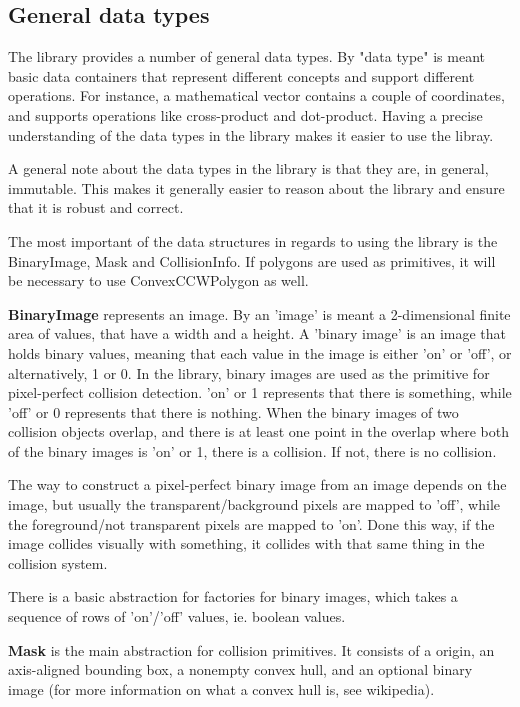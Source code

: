 
\subsection{General data types}

The library provides a number of general data types.
By "data type" is meant basic data containers that
represent different concepts and support different
operations. For instance, a mathematical vector contains a couple
of coordinates, and supports operations like cross-product
and dot-product. Having a precise understanding of the data types
in the library makes it easier to use the libray.

A general note about the data types in the library is that they
are, in general, immutable. This makes it generally easier
to reason about the library and ensure that it is robust
and correct.

The most important of the data structures in regards to using
the library is the BinaryImage, Mask and CollisionInfo.
If polygons are used as primitives, it will be necessary to use
ConvexCCWPolygon as well.

\textbf{BinaryImage} represents an image. By an 'image' is meant
a 2-dimensional finite area of values, that have a width and a height.
A 'binary image' is an image that holds binary values, meaning that
each value in the image is either 'on' or 'off', or alternatively,
1 or 0. In the library, binary images are used as the primitive for
pixel-perfect collision detection. 'on' or 1 represents that there
is something, while 'off' or 0 represents that there is nothing.
When the binary images of two collision objects overlap,
and there is at least one point in the overlap where both of the
binary images is 'on' or 1, there is a collision. If not, there
is no collision.

The way to construct a pixel-perfect binary image from an image
depends on the image, but usually the transparent/background pixels
are mapped to 'off', while the foreground/not transparent pixels are mapped
to 'on'. Done this way, if the image collides visually with something,
it collides with that same thing in the collision system.

There is a basic abstraction for factories for binary images,
which takes a sequence of rows of 'on'/'off' values, ie. boolean values.

\textbf{Mask} is the main abstraction for collision primitives.
It consists of a origin, an axis-aligned bounding box,
a nonempty convex hull, and an optional binary image
(for more information on what a convex hull is, see wikipedia).

